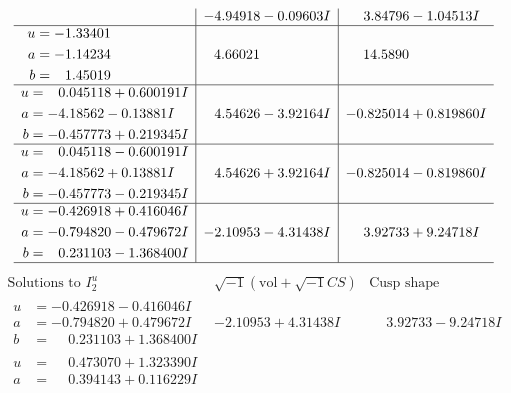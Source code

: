 \documentclass[1p]{elsarticle_modified}
\theoremstyle{definition}
\newcommand{\I}{\sqrt{-1}}
\begin{document}
$$\begin{array}{c|c|c}
 & -4.94918 - 0.09603 I & \phantom{-}3.84796 - 1.04513 I \\ \hline\begin{aligned}
u &= -1.33401\phantom{ +0.000000I} \\
a &= -1.14234\phantom{ +0.000000I} \\
b &= \phantom{-}1.45019\phantom{ +0.000000I}\end{aligned}
 & \phantom{-}4.66021\phantom{ +0.000000I} & \phantom{-}14.5890\phantom{ +0.000000I} \\ \hline\begin{aligned}
u &= \phantom{-}0.045118 + 0.600191 I \\
a &= -4.18562 - 0.13881 I \\
b &= -0.457773 + 0.219345 I\end{aligned}
 & \phantom{-}4.54626 - 3.92164 I & -0.825014 + 0.819860 I \\ \hline\begin{aligned}
u &= \phantom{-}0.045118 - 0.600191 I \\
a &= -4.18562 + 0.13881 I \\
b &= -0.457773 - 0.219345 I\end{aligned}
 & \phantom{-}4.54626 + 3.92164 I & -0.825014 - 0.819860 I \\ \hline\begin{aligned}
u &= -0.426918 + 0.416046 I \\
a &= -0.794820 - 0.479672 I \\
b &= \phantom{-}0.231103 - 1.368400 I\end{aligned}
 & -2.10953 - 4.31438 I & \phantom{-}3.92733 + 9.24718 I\\
 \hline 
 \end{array}$$\newpage$$\begin{array}{c|c|c}  
\text{Solutions to }I^u_{2}& \I (\text{vol} + \sqrt{-1}CS) & \text{Cusp shape}\\
 \hline 
\begin{aligned}
u &= -0.426918 - 0.416046 I \\
a &= -0.794820 + 0.479672 I \\
b &= \phantom{-}0.231103 + 1.368400 I\end{aligned}
 & -2.10953 + 4.31438 I & \phantom{-}3.92733 - 9.24718 I \\ \hline\begin{aligned}
u &= \phantom{-}0.473070 + 1.323390 I \\
a &= \phantom{-}0.394143 + 0.116229 I \\

\end{aligned}
\end{array}$$
\end{document}
